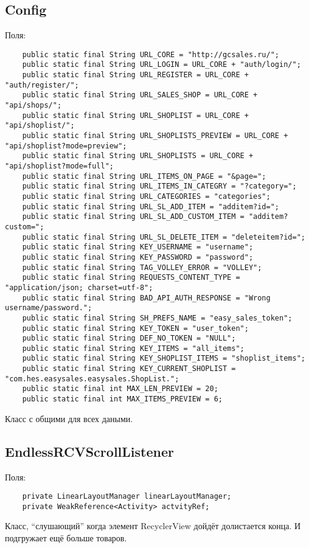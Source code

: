 \subsection{Config}
Поля:\\
\begin{small}
    \begin{verbatim}
    public static final String URL_CORE = "http://gcsales.ru/";
    public static final String URL_LOGIN = URL_CORE + "auth/login/";
    public static final String URL_REGISTER = URL_CORE + "auth/register/";
    public static final String URL_SALES_SHOP = URL_CORE + "api/shops/";
    public static final String URL_SHOPLIST = URL_CORE + "api/shoplist/";
    public static final String URL_SHOPLISTS_PREVIEW = URL_CORE + "api/shoplist?mode=preview";
    public static final String URL_SHOPLISTS = URL_CORE + "api/shoplist?mode=full";
    public static final String URL_ITEMS_ON_PAGE = "&page=";
    public static final String URL_ITEMS_IN_CATEGRY = "?category=";
    public static final String URL_CATEGORIES = "categories";
    public static final String URL_SL_ADD_ITEM = "additem?id=";
    public static final String URL_SL_ADD_CUSTOM_ITEM = "additem?custom=";
    public static final String URL_SL_DELETE_ITEM = "deleteitem?id=";
    public static final String KEY_USERNAME = "username";
    public static final String KEY_PASSWORD = "password";
    public static final String TAG_VOLLEY_ERROR = "VOLLEY";
    public static final String REQUESTS_CONTENT_TYPE = "application/json; charset=utf-8";
    public static final String BAD_API_AUTH_RESPONSE = "Wrong username/password.";
    public static final String SH_PREFS_NAME = "easy_sales_token";
    public static final String KEY_TOKEN = "user_token";
    public static final String DEF_NO_TOKEN = "NULL";
    public static final String KEY_ITEMS = "all_items";
    public static final String KEY_SHOPLIST_ITEMS = "shoplist_items";
    public static final String KEY_CURRENT_SHOPLIST = "com.hes.easysales.easysales.ShopList.";
    public static final int MAX_LEN_PREVIEW = 20;
    public static final int MAX_ITEMS_PREVIEW = 6;
\end{verbatim}
\end{small}
Класс с общими для всех даными.

\subsection{EndlessRCVScrollListener}
Поля:\\
\begin{small}
    \begin{verbatim}
    private LinearLayoutManager linearLayoutManager;
    private WeakReference<Activity> actvityRef;
\end{verbatim}
\end{small}
Класс, ``слушающий'' когда элемент RecyclerView дойдёт долистается конца. И подгружает ещё больше товаров.

